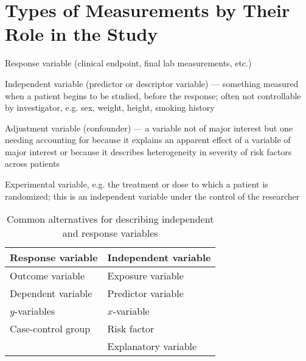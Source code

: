 \section{Types of Measurements by Their Role in the Study}  \label{sec:overview-measurement-role}
\bi
 \item Response variable (clinical endpoint, final lab measurements,
   etc.)
 \item Independent variable (predictor or descriptor variable) ---
   something measured when a patient begins to be studied, before the
   response; often not controllable by 
   investigator, e.g. sex, weight, height, smoking history
 \item Adjustment variable (confounder) --- a variable not of major
   interest but one needing accounting for because it explains an
   apparent effect of a variable of major interest or because it
   describes heterogeneity in severity of risk factors across patients
 \item Experimental variable, e.g. the treatment or dose to which a
   patient is randomized; this is an independent variable under the
   control of the researcher
 \ei

\begin{table}[h!]
 \caption{Common alternatives for describing independent and response variables}
\begin{center}
\begin{tabular}{ll} \hline \hline
Response variable & Independent variable \\ \hline
Outcome variable & Exposure variable \\
Dependent variable & Predictor variable \\
$y$-variables &  $x$-variable \\
Case-control group &  Risk factor \\
 & Explanatory variable \\ \hline \hline
\end{tabular}
\end{center}
\end{table}

